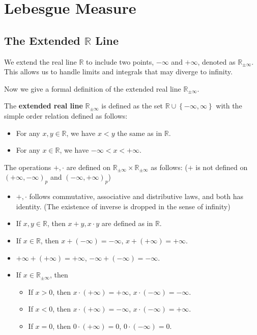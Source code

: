 \documentclass[../main.tex]{subfiles}
\begin{document}
\chapter{Lebesgue Measure}
\section{The Extended $\mathbb{R}$ Line}
We extend the real line $\mathbb{R}$ to include two points, $-\infty$ and $+\infty$, denoted as $\mathbb{R}_{\pm \infty}$. This allows us to handle limits and integrals that may diverge to infinity.

Now we give a formal definition of the extended real line $\mathbb{R}_{\pm \infty}$.
\begin{plainblackenv}
	The \textbf{extended real line} $\mathbb{R}_{\pm \infty}$ is defined as the set $\mathbb{R}\cup \left\{ -\infty ,\infty  \right\}$ with the simple order relation defined as follows:
	\begin{itemize}
		\item For any $x,y\in \mathbb{R}$, we have $x < y$ the same as in $\mathbb{R}$.
		\item For any $x\in \mathbb{R}$, we have $-\infty < x < +\infty$.
	\end{itemize}
	The operations $+, \cdot $ are defined on $\mathbb{R}_{\pm \infty} \times \mathbb{R}_{\pm \infty }$ as follows: ($+$ is not defined on $(+\infty ,-\infty )_p$ and $(-\infty ,+\infty )_p$)
	\begin{itemize}
		\item $+, \cdot $ follows commutative, associative and distributive laws, and both has identity. (The existence of inverse is dropped in the sense of infinity)
		\item If $x,y\in \mathbb{R}$, then $x+y, x\cdot y$ are defined as in $\mathbb{R}$.
		\item If $x\in \mathbb{R}$, then $x+(-\infty ) = -\infty $, $x+ (+\infty ) = +\infty $.
		\item $+\infty + (+\infty ) = +\infty $, $-\infty + (-\infty ) = -\infty $.
		\item If $x\in \mathbb{R}_{\pm \infty }$, then
			\begin{itemize}
			\item If $x>0$, then $x\cdot (+\infty ) = +\infty $, $x\cdot (-\infty ) = -\infty $.
			\item If $x<0$, then $x\cdot (+\infty ) = -\infty $, $x\cdot (-\infty ) = +\infty $.
			\item If $x=0$, then $0\cdot (+\infty ) = 0$, $0\cdot (-\infty ) = 0$.
			\end{itemize}
	\end{itemize}
\end{plainblackenv}
\end{document}
